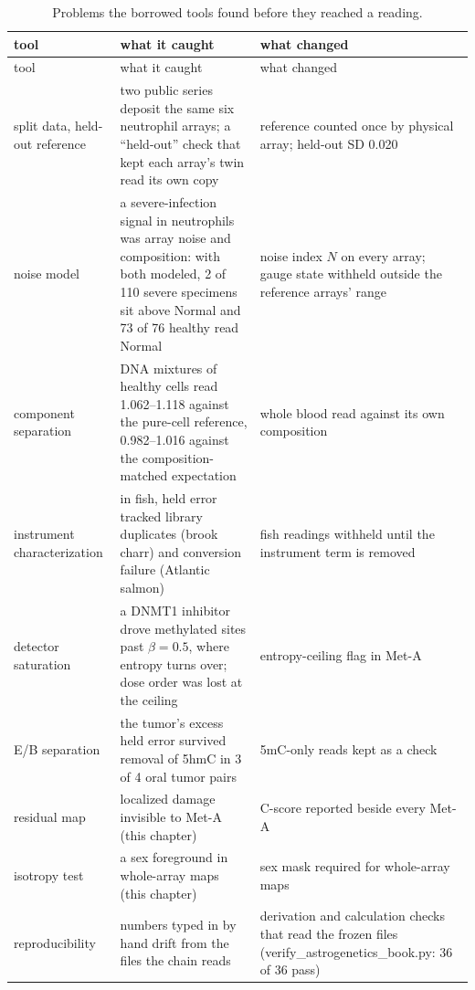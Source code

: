 \begin{center}\small
\begin{longtable}{@{}p{}p{}p{}@{}}
\caption{Problems the borrowed tools found before they reached a reading.}\label{tab:caught}\\
\toprule tool & what it caught & what changed \\\midrule\endfirsthead
\toprule tool & what it caught & what changed \\\midrule\endhead
split data, held-out reference & two public series deposit the same six neutrophil arrays; a ``held-out'' check that kept each array's twin
read its own copy & reference counted once by physical array; held-out SD 0.020 \\
noise model & a severe-infection signal in neutrophils was array noise and composition: with both modeled, 2 of 110 severe specimens sit above Normal
and 73 of 76 healthy read Normal & noise index $N$ on every array; gauge state withheld outside the reference arrays' range \\
component separation & DNA mixtures of healthy cells read 1.062--1.118 against the pure-cell reference, 0.982--1.016 against the
composition-matched expectation & whole blood read against its own composition \\
instrument characterization & in fish, held error tracked library duplicates (brook charr) and conversion failure (Atlantic salmon) & fish
readings withheld until the instrument term is removed \\
detector saturation & a DNMT1 inhibitor drove methylated sites past $\beta=0.5$, where entropy turns over; dose order was lost at the
ceiling & entropy-ceiling flag in Met-A \\
E/B separation & the tumor's excess held error survived removal of 5hmC in 3 of 4 oral tumor pairs & 5mC-only reads kept as a check \\
residual map & localized damage invisible to Met-A (this chapter) & C-score reported beside every Met-A \\
isotropy test & a sex foreground in whole-array maps (this chapter) & sex mask required for whole-array maps \\
reproducibility & numbers typed in by hand drift from the files the chain reads & derivation and calculation checks that read the frozen files
(verify\_astrogenetics\_book.py: 36 of 36 pass) \\\bottomrule
\end{longtable}
\end{center}

